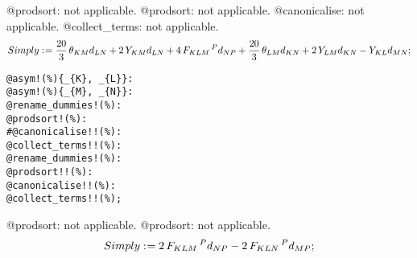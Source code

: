 \documentclass[11pt]{article}
\def\specialcolon{\mathrel{\mathop{:}}\hspace{-.5em}}
\begin{document}
@prodsort: not applicable.
@prodsort: not applicable.
@canonicalise: not applicable.
@collect\_terms: not applicable.
\begin{dmath*}[compact, spread=2pt]
Simply\specialcolon{}= \frac{20}{3}\, {\theta}_{K M} {d}_{L N} + 2\, {Y}_{K M} {d}_{L N} + 4\, {F}_{K L M}\,^{P} {d}_{N P} + \frac{20}{3}\, {\theta}_{L M} {d}_{K N} + 2\, {Y}_{L M} {d}_{K N} - {Y}_{K L} {d}_{M N};
\end{dmath*}
{\color[named]{Blue}\begin{verbatim}
@asym!(%){_{K}, _{L}}:
@asym!(%){_{M}, _{N}}:
@rename_dummies!(%):
@prodsort!(%):
#@canonicalise!!(%):
@collect_terms!!(%):
@rename_dummies!(%):
@prodsort!!(%):
@canonicalise!!(%):
@collect_terms!!(%);
\end{verbatim}}
@prodsort: not applicable.
@prodsort: not applicable.
\begin{dmath*}[compact, spread=2pt]
Simply\specialcolon{}= 2\, {F}_{K L M}\,^{P} {d}_{N P} - 2\, {F}_{K L N}\,^{P} {d}_{M P};
\end{dmath*}
\end{document}
